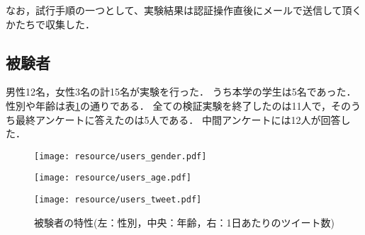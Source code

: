 なお，試行手順の一つとして、実験結果は認証操作直後にメールで送信して頂くかたちで収集した．

\subsection{被験者}
男性12名，女性3名の計15名が実験を行った．
うち本学の学生は5名であった．
性別や年齢は表\ref{fig:participants}の通りである．
全ての検証実験を終了したのは11人で，そのうち最終アンケートに答えたのは5人である．
中間アンケートには12人が回答した．

\begin{figure}[ht]
  \begin{minipage}{0.32\hsize}
    \begin{center}
      \texttt{[image: resource/users\_gender.pdf]}
    \end{center}
  \end{minipage}
  \begin{minipage}{0.32\hsize}
    \begin{center}
      \texttt{[image: resource/users\_age.pdf]}
    \end{center}
  \end{minipage}
  \begin{minipage}{0.32\hsize}
    \begin{center}
      \texttt{[image: resource/users\_tweet.pdf]}
    \end{center}
  \end{minipage}
  \caption{被験者の特性(左：性別，中央：年齢，右：1日あたりのツイート数)}
  \label{fig:participants}
\end{figure}

